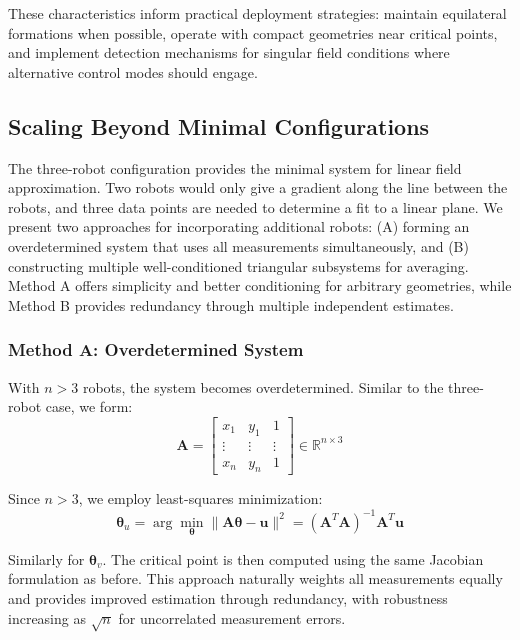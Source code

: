 \documentclass[lettersize,journal]{IEEEtran}
\begin{document}
These characteristics inform practical deployment strategies: maintain equilateral formations when possible, operate with compact geometries near critical points, and implement detection mechanisms for singular field conditions where alternative control modes should engage.

\subsection{Scaling Beyond Minimal Configurations}

The three-robot configuration provides the minimal system for linear field approximation. Two robots would only give a gradient along the line between the robots, and three data points are needed to determine a fit to a linear plane. We present two approaches for incorporating additional robots: (A) forming an overdetermined system that uses all measurements simultaneously, and (B) constructing multiple well-conditioned triangular subsystems for averaging. Method A offers simplicity and better conditioning for arbitrary geometries, while Method B provides redundancy through multiple independent estimates.

\subsubsection{Method A: Overdetermined System}

With $n > 3$ robots, the system becomes overdetermined. Similar to the three-robot case, we form:
\begin{equation}
\mathbf{A} = \begin{bmatrix} x_1 & y_1 & 1 \\ \vdots & \vdots & \vdots \\ x_n & y_n & 1 \end{bmatrix} \in \mathbb{R}^{n \times 3}
\end{equation}

Since $n > 3$, we employ least-squares minimization:
\begin{equation}
\boldsymbol{\theta}_u = \arg\min_{\boldsymbol{\theta}} \|\mathbf{A}\boldsymbol{\theta} - \mathbf{u}\|^2 = (\mathbf{A}^T\mathbf{A})^{-1}\mathbf{A}^T\mathbf{u}
\end{equation}

Similarly for $\boldsymbol{\theta}_v$. The critical point is then computed using the same Jacobian formulation as before. This approach naturally weights all measurements equally and provides improved estimation through redundancy, with robustness increasing as $\sqrt{n}$ for uncorrelated measurement errors.
\end{document}
